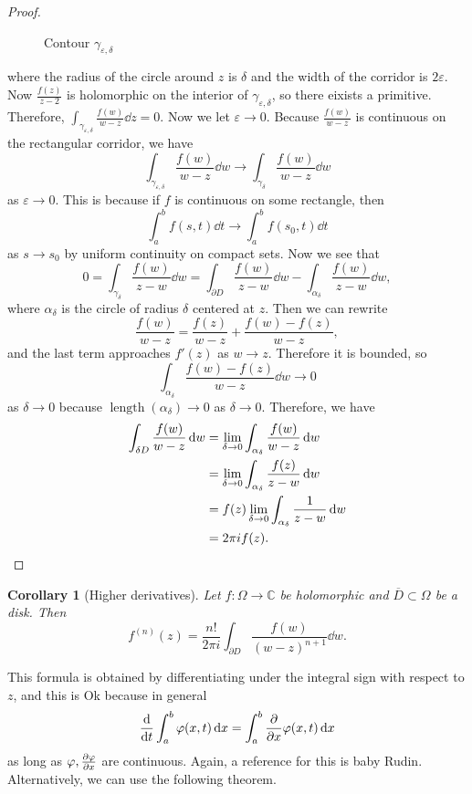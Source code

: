\documentclass[leqno, openany]{memoir}
\newtheorem{cor}[thm]{Corollary}
\theoremstyle{definition}
\theoremstyle{remark}
\theoremstyle{plain}
\theoremstyle{definition}
\theoremstyle{remark}
\newcommand{\C}{\mathbb{C}}
\newcommand{\ep}{\varepsilon}
\newcommand{\ol}[1]{\overline{#1}}
\DeclareMathOperator{\len}{length}
\begin{document}
\begin{proof}
\begin{figure}[H]
\begin{center}
    \end{center}
    \caption{Contour $\gamma_{\ep, \delta}$}%
    \label{fig:}
    \end{figure}
    where the radius of the circle around $z$ is $\delta$ and the width of the corridor is $2\ep$. Now $\frac{f(z)}{z-2}$ is holomorphic on the interior of $\gamma_{\ep, \delta}$, so there eixists a primitive. Therefore, $\int_{\gamma_{\ep, \delta}} \frac{f(w)}{w-z} \dd{z} = 0$. Now we let $\ep \to 0$. Because $\frac{f(w)}{w-z}$ is continuous on the rectangular corridor, we have 
    \[ \int_{\gamma_{\ep, \delta}} \frac{f(w)}{w-z} \dd{w} \to \int_{\gamma_{\delta}} \frac{f(w)}{w-z} \dd{w} \] 
    as $\ep \to 0$. This is because if $f$ is continuous on some rectangle, then
    \[ \int_a^b f(s,t) \dd{t} \to \int_a^b f(s_0, t) \dd{t} \]
    as $s \to s_0$ by uniform continuity on compact sets. Now we see that
    \[ 0 = \int_{\gamma_{\delta}} \frac{f(w)}{z-w} \dd{w} = \int_{\partial D} \frac{f(w)}{z-w} \dd{w} - \int_{\alpha_{\delta}} \frac{f(w)}{z-w} \dd{w}, \]
    where $\alpha_{\delta}$ is the circle of radius $\delta$ centered at $z$. Then we can rewrite
    \[ \frac{f(w)}{w-z} = \frac{f(z)}{w-z} + \frac{f(w) - f(z)}{w-z}, \]
    and the last term approaches $f'(z)$ as $w \to z$. Therefore it is bounded, so
    \[ \int_{\alpha_{\delta}} \frac{f(w) - f(z)}{w-z} \dd{w} \to 0 \]
    as $\delta \to 0$ because $\len(\alpha_{\delta}) \to 0$ as $\delta \to 0$. Therefore, we have
    \begin{align*} 
        \int_{\delta D} \frac{f(w)}{w-z} \dd{w} &= \lim_{\delta \to 0} \int_{\alpha_{\delta}} \frac{f(w)}{w-z} \dd{w} \\
                                                &= \lim_{\delta \to 0} \int_{\alpha_{\delta}} \frac{f(z)}{z-w} \dd{w} \\
                                                &= f(z) \lim_{\delta \to 0} \int_{\alpha_{\delta}} \frac{1}{z-w} \dd{w} \\
                                                &= 2 \pi i f(z). \qedhere
    \end{align*}
\end{proof}

\begin{cor}[Higher derivatives]
    Let $f \colon \Omega \to \C$ be holomorphic and $\ol{D} \subset \Omega$ be a disk. Then
    \[ f^{(n)}(z) = \frac{n!}{2 \pi i} \int_{\partial D} \frac{f(w)}{{(w-z)}^{n+1}} \dd{w}. \]
\end{cor}
This formula is obtained by differentiating under the integral sign with respect to $z$, and this is Ok because in general
\[ \dv{t} \int_a^b \varphi(x,t) \dd{x} = \int_a^b \pdv{x} \varphi(x, t) \dd{x} \]
as long as $\varphi, \pdv{\varphi}{x}$ are continuous. Again, a reference for this is baby Rudin. Alternatively, we can use the following theorem.
\end{document}
